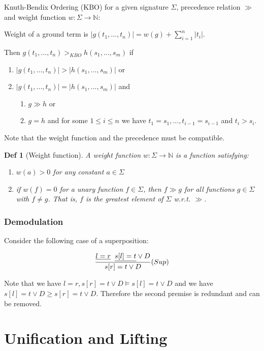 \documentclass[]{article}
\newtheorem*{definition*}{Def}
\begin{document}
Knuth-Bendix Ordering (KBO) for a given signature $\Sigma$, precedence relation $\gg$ and weight function $w:\Sigma \rightarrow \mathbb{N}$:

Weight of a ground term is $|g(t_1,...,t_n)| = w(g)+ \sum_{i=1}^{n}|t_i|$.

Then $g(t_1,...,t_n) >_{KBO} h(s_1,...,s_m)$ if
\begin{enumerate}
	\item $|g(t_1,...,t_n)| > |h(s_1,...,s_m)|$ or
	\item $|g(t_1,...,t_n)| = |h(s_1,...,s_m)|$ and
	\begin{enumerate}
		\item $g\gg h$ or
		\item $g=h$ and for some $1 \leq i \leq n$ we have $t_1=s_1,...,t_{i-1}=s_{i-1}$ and $t_i > s_i$.
	\end{enumerate}
\end{enumerate}

Note that the weight function and the precedence must be compatible.

\begin{definition*}[Weight function]
	A weight function $w:\Sigma \rightarrow \mathbb{N}$ is a function satisfying:
	\begin{enumerate}
		\item $w(a)>0$ for any constant $a\in \Sigma$
		\item if $w(f)=0$ for a unary function $f\in\Sigma$, then $f\gg g$ for all functions $g\in\Sigma$ with $f\not= g$. That is, $f$ is the greatest element of $\Sigma$ w.r.t. $\gg$.
	\end{enumerate}
\end{definition*}

\subsubsection{Demodulation}

Consider the following case of a superposition:

\begin{align*}
	\frac{\underline{l=r} \hspace{0.2cm} \underline{s[l]=t} \lor D}{s[r]=t \lor D}(Sup)
\end{align*}

Note that we have $l=r, s[r]=t \lor D \models s[l]=t \lor D$ and we have $s[l]=t \lor D \geq s[r]=t \lor D$. Therefore the second premise is redundant and can be removed.

\section{Unification and Lifting}
\end{document}
